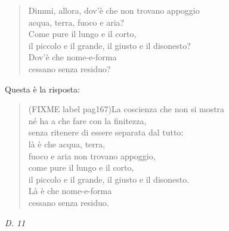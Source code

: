 \begin{quote}
Dimmi, allora, dov’è che non trovano appoggio \\
acqua, terra, fuoco e aria? \\
Come pure il lungo e il corto, \\
il piccolo e il grande, il giusto e il disonesto? \\
Dov’è che nome-e-forma \\
cessano senza residuo?
\end{quote}

Questa è la risposta:


\begin{quote}
(FIXME label pag167)La coscienza che non si mostra \\
né ha a che fare con la finitezza, \\
senza ritenere di essere separata dal tutto: \\
là è che acqua, terra, \\
fuoco e aria non trovano appoggio, \\
come pure il lungo e il corto, \\
il piccolo e il grande, il giusto e il disonesto. \\
Là è che nome-e-forma \\
cessano senza residuo.
\end{quote}

\emph{D. 11}


